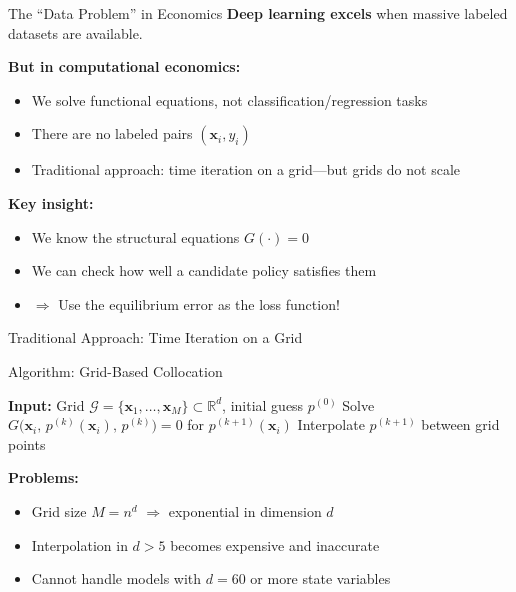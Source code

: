 \documentclass[aspectratio=169,11pt]{beamer}
\newcommand{\emphc}[1]{\textcolor{harvardcrimson}{#1}}
\newcommand{\x}{\bm{x}}
\newcommand{\R}{\mathbb{R}}
\begin{document}
\begin{frame}{The ``Data Problem'' in Economics}
\textbf{Deep learning excels} when massive labeled datasets are available.

\vspace{0.5em}
\textbf{But in computational economics:}
\begin{itemize}
    \item We solve \emphc{functional equations}, not classification/regression tasks
    \item There are \emphc{no labeled pairs} $(\x_i, y_i)$
    \item Traditional approach: \emphc{time iteration on a grid}---but grids do not scale
\end{itemize}

\vspace{0.5em}
\textbf{Key insight:}
\begin{itemize}
    \item We \emphc{know} the structural equations $G(\cdot) = 0$
    \item We can \emphc{check} how well a candidate policy satisfies them
    \item $\Rightarrow$ Use the \emphc{equilibrium error} as the loss function!
\end{itemize}
\end{frame}

\begin{frame}{Traditional Approach: Time Iteration on a Grid}
\begin{alertblock}{Algorithm: Grid-Based Collocation}
\begin{algorithmic}
\small
\STATE \textbf{Input:} Grid $\mathcal{G} = \{\x_1, \ldots, \x_M\} \subset \R^d$, initial guess $p^{(0)}$
    \FOR{each grid point $\x_i \in \mathcal{G}$}
        \STATE Solve $G\bigl(\x_i,\, p^{(k)}(\x_i),\, p^{(k)}\bigr) = 0$ for $p^{(k+1)}(\x_i)$
    \ENDFOR
    \STATE Interpolate $p^{(k+1)}$ between grid points
\ENDFOR
\end{algorithmic}
\end{alertblock}

\vspace{0.3em}
\textbf{Problems:}
\begin{itemize}
    \item Grid size $M = n^d$ $\Rightarrow$ \emphc{exponential} in dimension $d$
    \item Interpolation in $d > 5$ becomes expensive and inaccurate
    \item Cannot handle models with $d = 60$ or more state variables
\end{itemize}
\end{frame}
\end{document}

